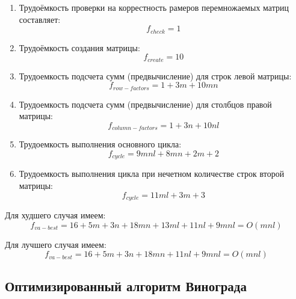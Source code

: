 \begin{enumerate}
	\item Трудоёмкость проверки на коррестность рамеров перемножаемых матриц составляет:
	\begin{equation}
		f_{check} = 1
	\end{equation}
	
	\item Трудоёмкость создания матрицы:
	\begin{equation}
		f_{create} = 10
	\end{equation}

	\item Трудоемкость подсчета сумм (предвычисление) для строк левой матрицы:
	\begin{equation}
		f_{row-factors} = 1 + 3m + 10mn
	\end{equation}
	
	\item Трудоемкость подсчета сумм (предвычисление) для столбцов правой матрицы:
	\begin{equation}
	f_{column-factors} = 1 + 3n + 10nl
	\end{equation}
	
	\item Трудоемкость выполнения основного цикла:
	\begin{equation}
	\label{for:impr_cycle}
	f_{cycle} = 9mnl + 8mn + 2m + 2
	\end{equation}

	\item Трудоемкость выполнения цикла при нечетном количестве строк второй матрицы:
	\begin{equation}
	\label{for:impr_cycle}
	f_{cycle} = 11ml + 3m + 3
	\end{equation}
\end{enumerate}

Для худшего случая имеем:
\begin{equation}
\label{for:bad_impr}
f_{va-best} = 16 + 5m + 3n + 18mn + 13 ml + 11nl + 9mnl = O(mnl)
\end{equation}

Для лучшего случая имеем:
\begin{equation}
\label{for:good_impr}
f_{va-best} = 16 + 5m + 3n + 18mn + 11nl + 9mnl = O(mnl)
\end{equation}


\subsection{Оптимизированный алгоритм Винограда}

